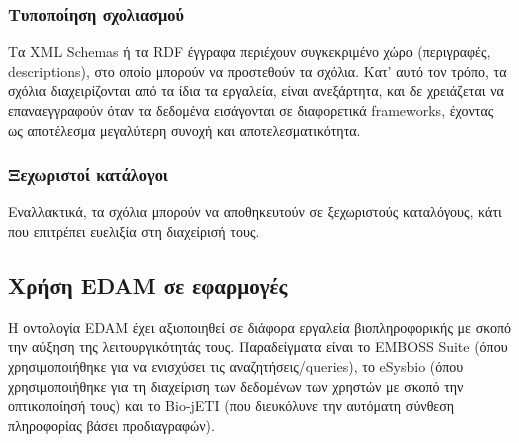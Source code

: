         \subsubsection{Τυποποίηση σχολιασμού}
            Τα XML Schemas ή τα RDF έγγραφα περιέχουν συγκεκριμένο χώρο (περιγραφές, descriptions), στο οποίο μπορούν να προστεθούν τα σχόλια.
            Κατ' αυτό τον τρόπο, τα σχόλια διαχειρίζονται από τα ίδια τα εργαλεία, είναι ανεξάρτητα, και δε χρειάζεται να επαναεγγραφούν όταν τα δεδομένα εισάγονται σε διαφορετικά frameworks, έχοντας ως αποτέλεσμα μεγαλύτερη συνοχή και αποτελεσματικότητα.

        \subsubsection{Ξεχωριστοί κατάλογοι}
            Εναλλακτικά, τα σχόλια μπορούν να αποθηκευτούν σε ξεχωριστούς καταλόγους, κάτι που επιτρέπει ευελιξία στη διαχείρισή τους.

    \subsection{Χρήση EDAM σε εφαρμογές}
            Η οντολογία EDAM έχει αξιοποιηθεί σε διάφορα εργαλεία βιοπληροφορικής με σκοπό την αύξηση της λειτουργικότητάς τους.
            Παραδείγματα είναι το EMBOSS Suite (όπου χρησιμοποιήθηκε για να ενισχύσει τις αναζητήσεις/queries), το eSysbio (όπου χρησιμοποιήθηκε για τη διαχείριση των δεδομένων των χρηστών με σκοπό την οπτικοποίησή τους) και το Bio-jETI (που διευκόλυνε την αυτόματη σύνθεση πληροφορίας βάσει προδιαγραφών).
